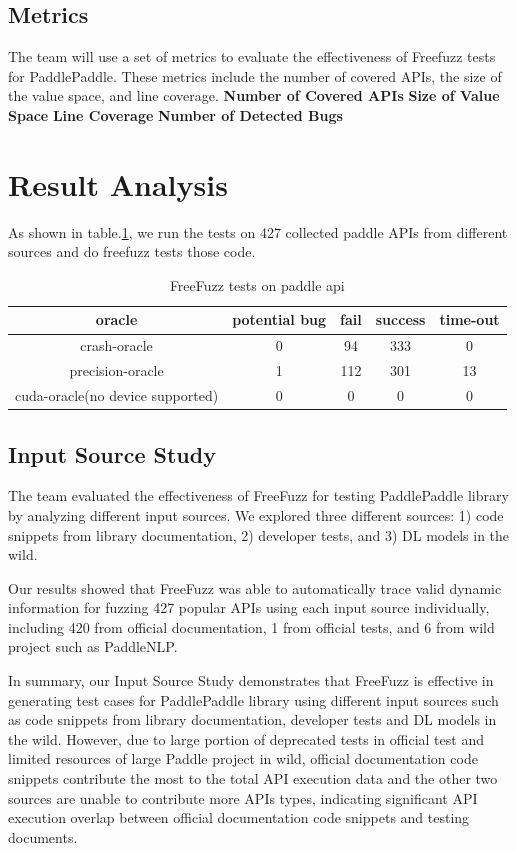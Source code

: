 \documentclass[sigconf]{acmart}
\begin{document}
  \subsection{Metrics}
  The team will use a set of metrics to evaluate the effectiveness of Freefuzz tests for PaddlePaddle. 
  These metrics include the number of covered APIs, the size of the value space, and line coverage.
  \textbf{Number of Covered APIs}
  \newline \textbf{Size of Value Space}
  \newline \textbf{Line Coverage}
  \newline \textbf{Number of Detected Bugs}

  \section{Result Analysis}
  As shown in table.\ref*{tab:freq}, we run the tests on 427 collected paddle APIs from different sources and do freefuzz tests those code.
  \begin{table}[t]
    \centering
    \caption{FreeFuzz tests on paddle api}
    \label{tab:freq}
    \begin{tabular}{ccccc}
      \toprule
      oracle&potential bug&fail&success&time-out\\
      \midrule
      crash-oracle & 0 & 94 & 333 &0\\
      precision-oracle & 1&112&301 &13 \\
      cuda-oracle(no device supported) & 0 & 0 & 0 &0\\
    \bottomrule
  \end{tabular}
  \end{table}


  \subsection{Input Source Study}
  The team evaluated the effectiveness of FreeFuzz for testing PaddlePaddle library by analyzing different input sources. We explored three different sources: 1) code snippets from library documentation, 2) developer tests, and 3) DL models in the wild.

  Our results showed that FreeFuzz was able to automatically trace valid dynamic information for fuzzing 427 popular APIs using each input source individually, including 420 from official documentation, 1 from official tests, and 6 from wild project such as PaddleNLP.

  In summary, our Input Source Study demonstrates that FreeFuzz is effective in generating test cases for PaddlePaddle library using different input sources such as code snippets from library documentation, developer tests and DL models in the wild. 
  However, due to large portion of deprecated tests in official test and limited resources of large Paddle project in wild, official documentation code snippets contribute the most to the total API execution data and the other two sources are unable to contribute more APIs types,
  indicating significant API execution overlap between official documentation code snippets and testing documents.
\end{document}
